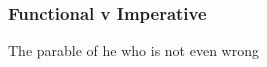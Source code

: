 {
\begin{frame}
\frametitle{Functional v Imperative}
\begin{center}
\LARGE{The parable of he who is not even wrong}
\end{center}
\end{frame}
}

